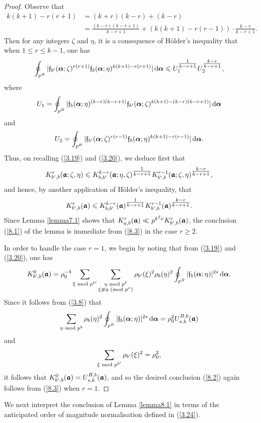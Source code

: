 \documentclass[12pt,reqno]{amsart}
\theoremstyle{definition}
\theoremstyle{remark}
\numberwithin{equation}{section}
\newcommand{\mmod}[1]{\,\,(\text{\rm mod}\,\,#1)}
\newcommand{\nmod}[1]{\,\,\text{\rm mod}\,\,#1}
\def\grf{{\mathfrak f}}\def\grF{{\mathfrak F}}
\def\zet{{\zeta}} \def\bfzet{{\boldsymbol \zeta}} \def\zetbar{{\overline \zet}}
\def\le{\leqslant} \def\ge{\geqslant} \def\pleq{\preccurlyeq} \def\ple{\prec}
\def\d{{\,{\rm d}}}
\begin{document}
\begin{proof} Observe that
\begin{align*}
k(k+1)-r(r+1)&=(k+r)(k-r)+(k-r)\\
&=\frac{(k-r)(k-r+1)}{k-r+1}+\left( k(k+1)-r(r-1)\right) \cdot \frac{k-r}{k-r+1}.
\end{align*}
Then for any integers $\zet$ and $\eta$, it is a consequence of H\"older's inequality that 
when $1\le r\le k-1$, one has
$$\oint_{p^B}|\grf_{b^\prime}(\bfalp;\zet)^{r(r+1)}\grf_b(\bfalp;\eta)^{k(k+1)-r(r+1)}|
\d\bfalp \le U_1^{\tfrac{1}{k-r+1}}U_2^{\tfrac{k-r}{k-r+1}},$$
where
$$U_1=\oint_{p^B}|\grf_b(\bfalp;\eta)^{(k-r)(k-r+1)}\grf_{b^\prime}(\bfalp;\zet)^{
k(k+1)-(k-r)(k-r+1)}|\d\bfalp $$
and
$$U_2=\oint_{p^B}|\grf_{b^\prime}(\bfalp;\zet)^{r(r-1)}\grf_b(\bfalp;\eta)^{
k(k+1)-r(r-1)}|\d\bfalp .$$
Thus, on recalling (\ref{3.19}) and (\ref{3.20}), we deduce first that
$$K_{b^\prime,b}^r(\bfgra;\zet,\eta)\le K_{b,b^\prime}^{k-r}(\bfgra;\eta,\zet)^{
\tfrac{1}{k-r+1}}K_{b^\prime,b}^{r-1}(\bfgra;\zet,\eta)^{\tfrac{k-r}{k-r+1}},$$
and hence, by another application of H\"older's inequality, that
\begin{equation}\label{8.3}
K_{b^\prime,b}^r(\bfgra)\le K_{b,b^\prime}^{k-r}(\bfgra)^{\tfrac{1}{k-r+1}}
K_{b^\prime,b}^{r-1}(\bfgra)^{\tfrac{k-r}{k-r+1}}.
\end{equation}
Since Lemma \ref{lemma7.1} shows that $K_{a,b}^r({\boldsymbol {{\mathfrak a}}})\ll p^{k^2\nu}
K_{b^\prime,b}^r({\boldsymbol {{\mathfrak a}}})$, the conclusion (\ref{8.1}) of the lemma is immediate from 
(\ref{8.3}) in the case $r\ge 2$.\par

In order to handle the case $r=1$, we begin by noting that from (\ref{3.19}) and 
(\ref{3.20}), one has
$$K_{b^\prime,b}^0(\bfgra)=\rho_0^{-4}\sum_{\xi\nmod{p^{b^\prime}}}
\sum_{\substack{\eta\nmod{p^b}\\ \xi\not \equiv \eta\mmod{p^\nu}}}\rho_{b^\prime}
(\xi)^2\rho_b(\eta)^2\oint_{p^B}|\grf_b(\bfalp;\eta)|^{2s}\d\bfalp .$$
Since it follows from (\ref{3.8}) that
$$\sum_{\eta\nmod{p^b}}\rho_b(\eta)^2\oint_{p^B}|\grf_b(\bfalp;\eta)|^{2s}
\d\bfalp =\rho_0^2U_{s,k}^{B,b}(\bfgra)$$
and
$$\sum_{\xi\nmod{p^{b^\prime}}}\rho_{b^\prime}(\xi)^2=\rho_0^2,$$
it follows that $K_{b^\prime,b}^0({\boldsymbol {{\mathfrak a}}})=U_{s,k}^{B,b}({\boldsymbol {{\mathfrak a}}})$, and so the desired 
conclusion (\ref{8.2}) again follows from (\ref{8.3}) when $r=1$.
\end{proof}

We next interpret the conclusion of Lemma \ref{lemma8.1} in terms of the anticipated 
order of magnitude normalisation defined in (\ref{3.24}).
\end{document}
